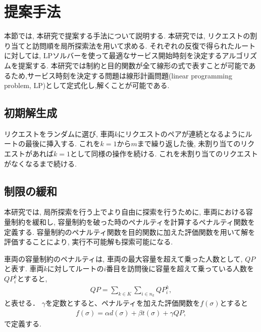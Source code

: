 \chapter{提案手法}\label{method}
本節では, 本研究で提案する手法について説明する. 本研究では, リクエストの割り当てと訪問順を局所探索法を用いて求める. それぞれの反復で得られたルートに対しては, LPソルバーを使って最適なサービス開始時刻を決定するアルゴリズムを提案する.
本研究では制約と目的関数が全て線形の式で表すことが可能であるため,サービス時刻を決定する問題は線形計画問題(linear programming problem, LP)として定式化し,解くことが可能である.
\section{初期解生成}
リクエストをランダムに選び, 車両$k$にリクエストのペアが連続となるようにルートの最後に挿入する. これを$k = 1 から m$まで繰り返した後, 未割り当てのリクエストがあれば$k = 1 $として同様の操作を続ける. これを未割り当てのリクエストがなくなるまで続ける.

\section{制限の緩和}
本研究では, 局所探索を行う上でより自由に探索を行うために, 車両における容量制約を緩和し, 容量制約を破った時のペナルティを計算するペナルティ関数を定義する. 容量制約のペナルティ関数を目的関数に加えた評価関数を用いて解を評価することにより, 実行不可能解も探索可能になる.

車両の容量制約のペナルティは, 車両の最大容量を超えて乗った人数として, $QP$と表す. 車両$k$に対してルートの$i$番目を訪問後に容量を超えて乗っている人数を$QP_i^k$とすると,
\begin{align*}
  QP = \sum_{k \in K}\sum_{i \in n_k} QP_i^k,
\end{align*}
と表せる．
$\gamma$を定数とすると、ペナルティを加えた評価関数を$f(\sigma)$とすると
\begin{align*}
  f(\sigma) = \alpha d(\sigma)+ \beta t(\sigma) + \gamma QP,
\end{align*}
で定義する.
